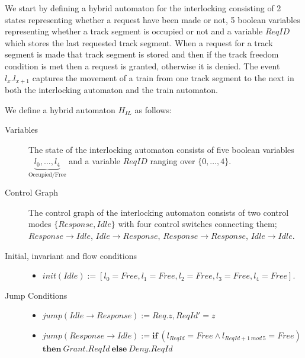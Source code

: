 We start by defining a hybrid automaton for the interlocking consisting of 2 states representing whether a request have been made or not, 5 boolean variables representing whether a track segment is occupied or not and a variable $ReqID$ which stores the last requested track segment. When a request for a track segment is made that track segment is stored and then if the track freedom condition is met then a request is granted, otherwise it is denied. The event $l_x.l_{x+1}$ captures the movement of a train from one track segment to the next in both the interlocking automaton and the train automaton.
\medskip
\begin{mydef}
We define a hybrid automaton $H_{IL}$ as follows:
\begin{description}
\item[Variables] The state of the interlocking automaton consists of five boolean variables  $\underbrace{l_0, \ldots , l_4}_\text{Occupied/Free}$ and a variable $ReqID$ ranging over $\{0 , \ldots , 4 \}$.

\item[Control Graph] The control graph of the interlocking automaton consists of two control modes $\{Response, Idle \}$ with four control switches connecting them; $Response \to Idle$, $Idle \to Response$, $Response \to Response$, $Idle \to Idle$.

\item[Initial, invariant and flow conditions] \hspace*{0mm}
	\begin{itemize}
	\item $init(Idle) := [l_0 = Free, l_1 = Free, l_2 = Free, l_3 = Free, l_4 = Free]$.

	\end{itemize}

\item[Jump Conditions] \hspace*{0mm}

	\begin{itemize}
	\item $jump(Idle \to Response) :=  Req.z , ReqId' = z$

	
	\item $jump(Response \to Idle) := \mathbf{if} \ (l_{ReqId} = Free \wedge l_{ReqId +1 \, mod \, 5} = Free)$ \\
             \hspace{\fill} $\mathbf{then} \ Grant. ReqId \ \mathbf{else} \ Deny.ReqId$ 


\end{itemize}
\end{description}
\end{mydef}

